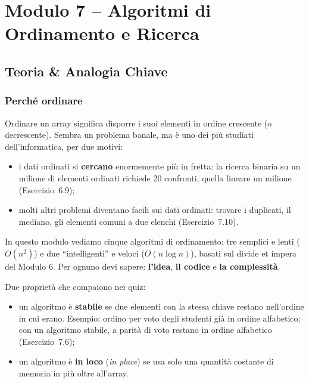 \chapter{Modulo 7 -- Algoritmi di Ordinamento e Ricerca}

\section{Teoria \& Analogia Chiave}

\subsection*{Perché ordinare}

Ordinare un array significa disporre i suoi elementi in ordine crescente (o
decrescente). Sembra un problema banale, ma è uno dei più studiati
dell'informatica, per due motivi:
\begin{itemize}
  \item i dati ordinati si \textbf{cercano} enormemente più in fretta: la ricerca
        binaria su un milione di elementi ordinati richiede 20 confronti, quella
        lineare un milione (Esercizio~6.9);
  \item molti altri problemi diventano facili sui dati ordinati: trovare i
        duplicati, il mediano, gli elementi comuni a due elenchi (Esercizio~7.10).
\end{itemize}
In questo modulo vediamo cinque algoritmi di ordinamento: tre semplici e lenti
($O(n^2)$) e due ``intelligenti'' e veloci ($O(n \log n)$), basati sul divide et
impera del Modulo 6. Per ognuno devi sapere: \textbf{l'idea}, \textbf{il codice}
e \textbf{la complessità}.

Due proprietà che compaiono nei quiz:
\begin{itemize}
  \item un algoritmo è \textbf{stabile} se due elementi con la stessa chiave
        restano nell'ordine in cui erano. Esempio: ordino per voto degli studenti
        già in ordine alfabetico; con un algoritmo stabile, a parità di voto restano
        in ordine alfabetico (Esercizio~7.6);
  \item un algoritmo è \textbf{in loco} (\emph{in place}) se usa solo una quantità
        costante di memoria in più oltre all'array.
\end{itemize}

